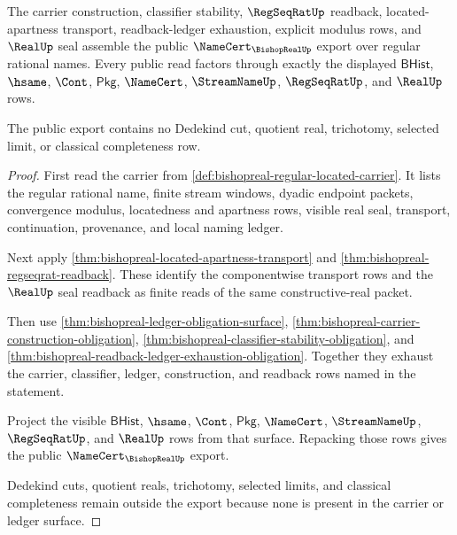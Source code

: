 \begin{theorem}
\label{thm:bishopreal-public-namecert-export}
The carrier construction, classifier stability, $\RegSeqRatUp$ readback,
located-apartness transport, readback-ledger exhaustion, explicit modulus rows,
and $\RealUp$ seal assemble the public $\NameCert_{\BishopRealUp}$ export over
regular rational names. Every public read factors through exactly the displayed
$\mathsf{BHist}$, $\hsame$, $\Cont$, $\mathsf{Pkg}$, $\NameCert$,
$\StreamNameUp$, $\RegSeqRatUp$, and $\RealUp$ rows.

The public export contains no Dedekind cut, quotient real, trichotomy, selected
limit, or classical completeness row.
\end{theorem}
\begin{proof}
First read the carrier from
\autoref{def:bishopreal-regular-located-carrier}. It lists the regular
rational name, finite stream windows, dyadic endpoint packets, convergence
modulus, locatedness and apartness rows, visible real seal, transport,
continuation, provenance, and local naming ledger.

Next apply \autoref{thm:bishopreal-located-apartness-transport} and
\autoref{thm:bishopreal-regseqrat-readback}. These identify the componentwise
transport rows and the $\RealUp$ seal readback as finite reads of the same
constructive-real packet.

Then use \autoref{thm:bishopreal-ledger-obligation-surface},
\autoref{thm:bishopreal-carrier-construction-obligation},
\autoref{thm:bishopreal-classifier-stability-obligation}, and
\autoref{thm:bishopreal-readback-ledger-exhaustion-obligation}. Together they
exhaust the carrier, classifier, ledger, construction, and readback rows named
in the statement.

Project the visible $\mathsf{BHist}$, $\hsame$, $\Cont$, $\mathsf{Pkg}$,
$\NameCert$, $\StreamNameUp$, $\RegSeqRatUp$, and $\RealUp$ rows from that
surface. Repacking those rows gives the public $\NameCert_{\BishopRealUp}$
export.

Dedekind cuts, quotient reals, trichotomy, selected limits, and classical
completeness remain outside the export because none is present in the carrier
or ledger surface.
\end{proof}

